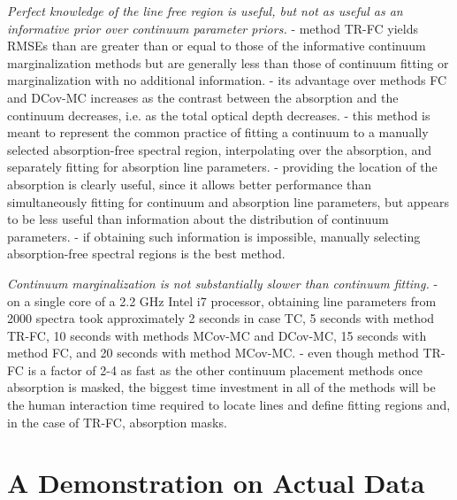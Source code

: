 \documentclass[trackchanges]{aastex62}
\begin{document}
{\emph{Perfect knowledge of the line free region is useful, but not as useful as an informative prior over continuum parameter priors.}
- method TR-FC yields RMSEs than are greater than or equal to those of the informative continuum marginalization methods but are generally less than those of continuum fitting or marginalization with no additional information.
- its advantage over methods FC and DCov-MC increases as the contrast between the absorption and the continuum decreases, i.e. as the total optical depth decreases.
- this method is meant to represent the common practice of fitting a continuum to a manually selected absorption-free spectral region, interpolating over the absorption, and separately fitting for absorption line parameters.
- providing the location of the absorption is clearly useful, since it allows better performance than simultaneously fitting for continuum and absorption line parameters, but appears to be less useful than information about the distribution of continuum parameters.
- if obtaining such information is impossible, manually selecting absorption-free spectral regions is the best method.


\emph{Continuum marginalization is not substantially slower than continuum fitting.}
- on a single core of a 2.2 GHz Intel i7 processor, obtaining line parameters from 2000 spectra took approximately 2 seconds in case TC, 5 seconds with method TR-FC, 10 seconds with methods MCov-MC and DCov-MC, 15 seconds with method FC, and 20 seconds with method MCov-MC.
- even though method TR-FC is a factor of 2-4 as fast as the other continuum placement methods once absorption is masked, the biggest time investment in all of the methods will be the human interaction time required to locate lines and define fitting regions and, in the case of TR-FC, absorption masks.

}


\section{A Demonstration on Actual Data}
\end{document}
